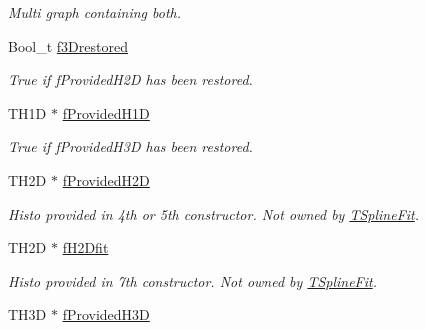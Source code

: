 \begin{DoxyCompactItemize}
\begin{DoxyCompactList}\small\item\em Multi graph containing both. \end{DoxyCompactList}\item 
\hypertarget{classTSplineFit_a499b4317bff4ed66c443007ec5ababc8}{Bool\-\_\-t \hyperlink{classTSplineFit_a499b4317bff4ed66c443007ec5ababc8}{f3\-Drestored}}\label{classTSplineFit_a499b4317bff4ed66c443007ec5ababc8}

\begin{DoxyCompactList}\small\item\em True if f\-Provided\-H2\-D has been restored. \end{DoxyCompactList}\item 
\hypertarget{classTSplineFit_a081dc82b0c3e22b95df72475300ad114}{T\-H1\-D $\ast$ \hyperlink{classTSplineFit_a081dc82b0c3e22b95df72475300ad114}{f\-Provided\-H1\-D}}\label{classTSplineFit_a081dc82b0c3e22b95df72475300ad114}

\begin{DoxyCompactList}\small\item\em True if f\-Provided\-H3\-D has been restored. \end{DoxyCompactList}\item 
\hypertarget{classTSplineFit_ad6a68e5a2bc8a75cf4edcadb8e0553aa}{T\-H2\-D $\ast$ \hyperlink{classTSplineFit_ad6a68e5a2bc8a75cf4edcadb8e0553aa}{f\-Provided\-H2\-D}}\label{classTSplineFit_ad6a68e5a2bc8a75cf4edcadb8e0553aa}

\begin{DoxyCompactList}\small\item\em Histo provided in 4th or 5th constructor. Not owned by \hyperlink{classTSplineFit}{T\-Spline\-Fit}. \end{DoxyCompactList}\item 
\hypertarget{classTSplineFit_a81c9a7443a935589ce5c61d28d13ed72}{T\-H2\-D $\ast$ \hyperlink{classTSplineFit_a81c9a7443a935589ce5c61d28d13ed72}{f\-H2\-Dfit}}\label{classTSplineFit_a81c9a7443a935589ce5c61d28d13ed72}

\begin{DoxyCompactList}\small\item\em Histo provided in 7th constructor. Not owned by \hyperlink{classTSplineFit}{T\-Spline\-Fit}. \end{DoxyCompactList}\item 
\hypertarget{classTSplineFit_a5673341cfcd1f47b6beedd494f07c0c4}{T\-H3\-D $\ast$ \hyperlink{classTSplineFit_a5673341cfcd1f47b6beedd494f07c0c4}{f\-Provided\-H3\-D}}\label{classTSplineFit_a5673341cfcd1f47b6beedd494f07c0c4}


\end{DoxyCompactItemize}
